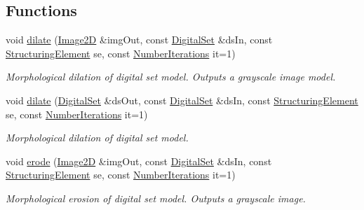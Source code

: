 \subsection*{Functions}
\begin{DoxyCompactItemize}
\item 
void \hyperlink{namespaceDIPaCUS_1_1Morphology_a94b7121d637a835ba0982b2578ba142b}{dilate} (\hyperlink{namespaceDIPaCUS_1_1Morphology_a9aff9edf28d681accfc54435fbefcbee}{Image2D} \&img\+Out, const \hyperlink{namespaceDIPaCUS_1_1Morphology_ab69fa725716b0ed4c311c0d00a292be7}{Digital\+Set} \&ds\+In, const \hyperlink{structDIPaCUS_1_1Morphology_1_1StructuringElement}{Structuring\+Element} se, const \hyperlink{namespaceDIPaCUS_1_1Morphology_a8ffa7d1c2023be8b21bc87a4b7df7cca}{Number\+Iterations} it=1)
\begin{DoxyCompactList}\small\item\em Morphological dilation of digital set model. Outputs a grayscale image model. \end{DoxyCompactList}\item 
void \hyperlink{namespaceDIPaCUS_1_1Morphology_a2748662dcc9ecb081156aaa599a535d8}{dilate} (\hyperlink{namespaceDIPaCUS_1_1Morphology_ab69fa725716b0ed4c311c0d00a292be7}{Digital\+Set} \&ds\+Out, const \hyperlink{namespaceDIPaCUS_1_1Morphology_ab69fa725716b0ed4c311c0d00a292be7}{Digital\+Set} \&ds\+In, const \hyperlink{structDIPaCUS_1_1Morphology_1_1StructuringElement}{Structuring\+Element} se, const \hyperlink{namespaceDIPaCUS_1_1Morphology_a8ffa7d1c2023be8b21bc87a4b7df7cca}{Number\+Iterations} it=1)
\begin{DoxyCompactList}\small\item\em Morphological dilation of digital set model. \end{DoxyCompactList}\item 
void \hyperlink{namespaceDIPaCUS_1_1Morphology_a3c3fd0423507cf0d21084b434039689e}{erode} (\hyperlink{namespaceDIPaCUS_1_1Morphology_a9aff9edf28d681accfc54435fbefcbee}{Image2D} \&img\+Out, const \hyperlink{namespaceDIPaCUS_1_1Morphology_ab69fa725716b0ed4c311c0d00a292be7}{Digital\+Set} \&ds\+In, const \hyperlink{structDIPaCUS_1_1Morphology_1_1StructuringElement}{Structuring\+Element} se, const \hyperlink{namespaceDIPaCUS_1_1Morphology_a8ffa7d1c2023be8b21bc87a4b7df7cca}{Number\+Iterations} it=1)
\begin{DoxyCompactList}\small\item\em Morphological erosion of digital set model. Outputs a grayscale image. \end{DoxyCompactList}\item 

\end{DoxyCompactItemize}
